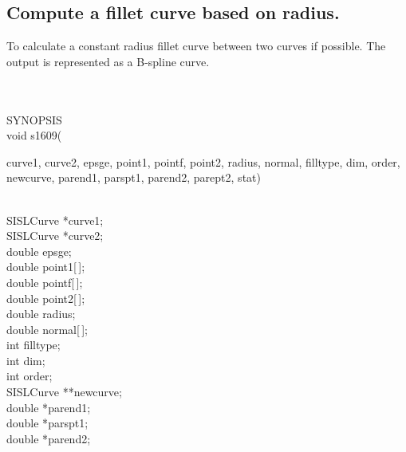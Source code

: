 \subsection{Compute a fillet curve based on radius.}
\begin{minipg1}
  To calculate a constant radius fillet curve between two curves
  if possible.
  The output is represented as a B-spline curve.
\end{minipg1} \\ \\
SYNOPSIS\\
        \>void s1609(\begin{minipg3}
        {\fov curve1}, {\fov curve2}, {\fov epsge}, {\fov point1}, {\fov pointf}, {\fov point2}, {\fov radius}, {\fov normal},\linebreak
        {\fov filltype}, {\fov dim}, {\fov order}, {\fov newcurve}, {\fov parend1}, {\fov parspt1}, {\fov parend2},\linebreak
        {\fov parept2}, {\fov stat})
                \end{minipg3}\\[0.3ex]
                \>\>    SISLCurve       \>      *{\fov curve1};\\
                \>\>    SISLCurve       \>      *{\fov curve2};\\
                \>\>    double  \>      {\fov epsge};\\
                \>\>    double  \>      {\fov point1}[\,];\\
                \>\>    double  \>      {\fov pointf}[\,];\\
                \>\>    double  \>      {\fov point2}[\,];\\
                \>\>    double  \>      {\fov radius};\\
                \>\>    double  \>      {\fov normal}[\,];\\
                \>\>    int     \>      {\fov filltype};\\
                \>\>    int     \>      {\fov dim};\\
                \>\>    int     \>      {\fov order};\\
                \>\>    SISLCurve       \>      **{\fov newcurve};\\
                \>\>    double  \>      *{\fov parend1};\\
                \>\>    double  \>      *{\fov parspt1};\\
                \>\>    double  \>      *{\fov parend2};\\
